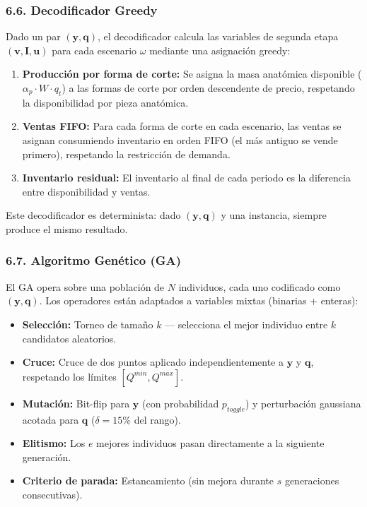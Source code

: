 \documentclass[
  spanish,
  12pt,
]{article}
\providecommand{\tightlist}{%
  \setlength{\itemsep}{0pt}\setlength{\parskip}{0pt}}
\begin{document}
\subsubsection{6.6. Decodificador Greedy}\label{decodificador-greedy}

Dado un par \((\mathbf{y}, \mathbf{q})\), el decodificador calcula las
variables de segunda etapa \((\mathbf{v}, \mathbf{I}, \mathbf{u})\) para
cada escenario \(\omega\) mediante una asignación greedy:

\begin{enumerate}
\def\labelenumi{\arabic{enumi}.}
\tightlist
\item
  \textbf{Producción por forma de corte:} Se asigna la masa anatómica
  disponible (\(\alpha_p \cdot W \cdot q_t\)) a las formas de corte por
  orden descendente de precio, respetando la disponibilidad por pieza
  anatómica.
\item
  \textbf{Ventas FIFO:} Para cada forma de corte en cada escenario, las
  ventas se asignan consumiendo inventario en orden FIFO (el más antiguo
  se vende primero), respetando la restricción de demanda.
\item
  \textbf{Inventario residual:} El inventario al final de cada periodo
  es la diferencia entre disponibilidad y ventas.
\end{enumerate}

Este decodificador es determinista: dado \((\mathbf{y}, \mathbf{q})\) y
una instancia, siempre produce el mismo resultado.

\subsubsection{6.7. Algoritmo Genético
(GA)}\label{algoritmo-genuxe9tico-ga}

El GA opera sobre una población de \(N\) individuos, cada uno codificado
como \((\mathbf{y}, \mathbf{q})\). Los operadores están adaptados a
variables mixtas (binarias + enteras):

\begin{itemize}
\tightlist
\item
  \textbf{Selección:} Torneo de tamaño \(k\) --- selecciona el mejor
  individuo entre \(k\) candidatos aleatorios.
\item
  \textbf{Cruce:} Cruce de dos puntos aplicado independientemente a
  \(\mathbf{y}\) y \(\mathbf{q}\), respetando los límites
  \([Q^{min}, Q^{max}]\).
\item
  \textbf{Mutación:} Bit-flip para \(\mathbf{y}\) (con probabilidad
  \(p_{toggle}\)) y perturbación gaussiana acotada para \(\mathbf{q}\)
  (\(\delta = 15\%\) del rango).
\item
  \textbf{Elitismo:} Los \(e\) mejores individuos pasan directamente a
  la siguiente generación.
\item
  \textbf{Criterio de parada:} Estancamiento (sin mejora durante \(s\)
  generaciones consecutivas).
\end{itemize}
\end{document}
